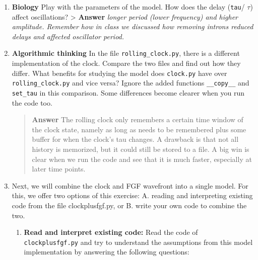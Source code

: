 \documentclass[
  letterpaper,
  DIV=11,
  numbers=noendperiod]{scrreprt}
\theoremstyle{definition}
\theoremstyle{remark}
\begin{document}
\begin{enumerate}
\def\labelenumi{\arabic{enumi}.}
\setcounter{enumi}{3}
\item
  \textbf{Biology} Play with the parameters of the model. How does the
  delay (\texttt{tau}/ \(\tau\)) affect oscillations? \textgreater{}
  \textbf{Answer} \emph{longer period (lower frequency) and higher
  amplitude. Remember how in class we discussed how removing introns
  reduced delays and affected oscillator period.}
\item
  \textbf{Algorithmic thinking} In the file \texttt{rolling\_clock.py},
  there is a different implementation of the clock. Compare the two
  files and find out how they differ. What benefits for studying the
  model does \texttt{clock.py} have over \texttt{rolling\_clock.py} and
  vice versa? Ignore the added functions \texttt{\_\_copy\_\_} and
  \texttt{set\_tau} in this comparison. Some differences become clearer
  when you run the code too.

  \begin{quote}
  \textbf{Answer} The rolling clock only remembers a certain time window
  of the clock state, namely as long as needs to be remembered plus some
  buffer for when the clock's tau changes. A drawback is that not all
  history is memorized, but it could still be stored to a file. A big
  win is clear when we run the code and see that it is much faster,
  especially at later time points.
  \end{quote}
\item
  Next, we will combine the clock and FGF wavefront into a single model.
  For this, we offer two options of this exercise: A. reading and
  interpreting existing code from the file clockplusfgf.py, or B. write
  your own code to combine the two.

  \begin{enumerate}
  \def\labelenumii{\arabic{enumii}.}
  \item
    \textbf{Read and interpret existing code:} Read the code of
    \texttt{clockplusfgf.py} and try to understand the assumptions from
    this model implementation by answering the following questions:


\end{enumerate}
\end{enumerate}
\end{document}
